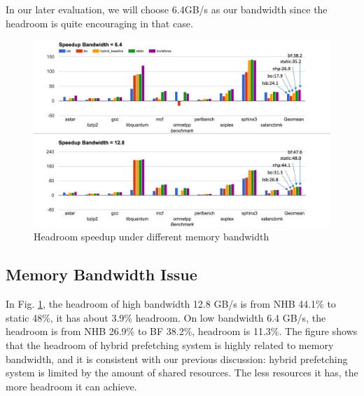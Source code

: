   In our later evaluation, we will choose 6.4GB/s as our bandwidth since the headroom is quite encouraging in that case.


  \begin{figure}[ht!]
	   \centering
	   \includegraphics[width=1.0\textwidth]{images/headroom_speedup.png}
	   \caption{Headroom speedup under different memory bandwidth}
	  \label{fig:headroom_speedup}
  \end{figure}

  \subsection{Memory Bandwidth Issue}
  \label{sec:memorybandwidthissue}

  In Fig. \ref{fig:headroom_speedup}, the headroom of high bandwidth 12.8 GB/s is from NHB 44.1\% to static 48\%, it has about 3.9\% headroom. On low bandwidth 6.4 GB/s, the headroom is from NHB 26.9\% to BF 38.2\%, headroom is 11.3\%.
  The figure shows that the headroom of hybrid prefetching system is highly related to memory bandwidth, and it is consistent with our previous discussion: hybrid prefetching system is limited by the amount of shared resources.
  The less resources it has, the more headroom it can achieve.\par

